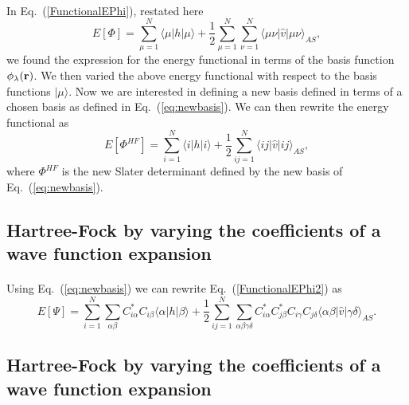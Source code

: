 \documentclass[%
twoside,                 %
final,                   %
10pt]{article}
\begin{document}
\paragraph{}
In Eq.~(\ref{FunctionalEPhi}), restated here
\[
  E[\Phi] 
  = \sum_{\mu=1}^N \langle \mu | h | \mu \rangle +
  \frac{1}{2}\sum_{{\mu}=1}^N\sum_{{\nu}=1}^N \langle \mu\nu|\hat{v}|\mu\nu\rangle_{AS},
\]
we found the expression for the energy functional in terms of the basis function $\phi_{\lambda}({\bf r})$. We then  varied the above energy functional with respect to the basis functions $|\mu \rangle$. 
Now we are interested in defining a new basis defined in terms of
a chosen basis as defined in Eq.~(\ref{eq:newbasis}). We can then rewrite the energy functional as
\begin{equation}
  E[\Phi^{HF}] 
  = \sum_{i=1}^N \langle i | h | i \rangle +
  \frac{1}{2}\sum_{ij=1}^N\langle ij|\hat{v}|ij\rangle_{AS}, \label{FunctionalEPhi2}
\end{equation}
where $\Phi^{HF}$ is the new Slater determinant defined by the new basis of Eq.~(\ref{eq:newbasis}).



\subsection*{Hartree-Fock by varying the coefficients of a wave function expansion}

\paragraph{}
Using Eq.~(\ref{eq:newbasis}) we can rewrite Eq.~(\ref{FunctionalEPhi2}) as 
\begin{equation}
  E[\Psi] 
  = \sum_{i=1}^N \sum_{\alpha\beta} C^*_{i\alpha}C_{i\beta}\langle \alpha | h | \beta \rangle +
  \frac{1}{2}\sum_{ij=1}^N\sum_{{\alpha\beta\gamma\delta}} C^*_{i\alpha}C^*_{j\beta}C_{i\gamma}C_{j\delta}\langle \alpha\beta|\hat{v}|\gamma\delta\rangle_{AS}. \label{FunctionalEPhi3}
\end{equation}



\subsection*{Hartree-Fock by varying the coefficients of a wave function expansion}
\end{document}
